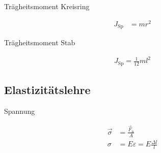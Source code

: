 \begin{boxleft}Trägheitsmoment Kreisring
\end{boxleft}\begin{boxrightshaded}
\begin{align}
J_\text{Sp}&=mr^2
\end{align}
\end{boxrightshaded}

\begin{boxleft}Trägheitsmoment Stab
\end{boxleft}\begin{boxrightshaded}
\begin{align}
J_\text{Sp}=\frac{1}{12}ml^2
\end{align}
\end{boxrightshaded}

\subsection{Elastizitätslehre}

\begin{boxleft}Spannung
\end{boxleft}\begin{boxrightshaded}
\begin{align}
\vec{\sigma}&=\frac{\vec{F}_n}{A}\\
\sigma&=E \varepsilon=E\frac{\Delta l}{l}
\end{align}
\end{boxrightshaded}